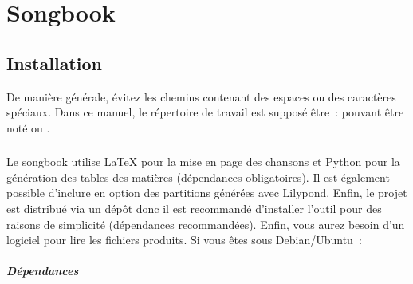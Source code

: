 \chapter{Songbook}
\setcounter{chapter}{1}
\label{chap:songbook}
\minitoc
{}


\section{Installation}
\label{sec:install}

De manière générale, évitez les chemins contenant des espaces ou des
caractères spéciaux. Dans ce manuel, le répertoire de travail est
supposé être~:  pouvant être noté
 ou .

\subsection{\linux}

Le songbook utilise \LaTeX{} pour la mise en page des chansons et
Python pour la génération des tables des matières (dépendances
obligatoires). Il est également possible d'inclure en option des
partitions générées avec Lilypond. Enfin, le projet est distribué via
un dépôt \git donc il est recommandé d'installer l'outil pour des
raisons de simplicité (dépendances recommandées). Enfin, vous aurez
besoin d'un logiciel pour lire les fichiers  produits. Si vous êtes
sous Debian/Ubuntu~:

\paragraph{Dépendances}

